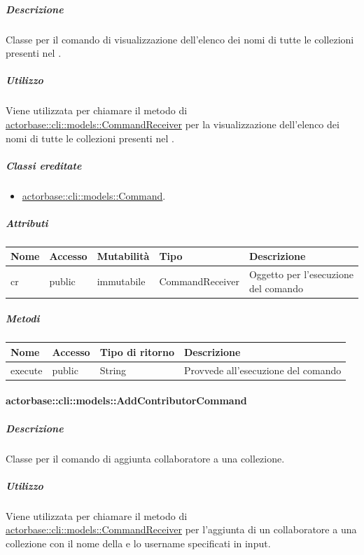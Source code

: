 \documentclass{scalatekids-article}
\begin{document}
\subparagraph{Descrizione}

Classe per il comando di visualizzazione dell'elenco dei nomi di tutte le
collezioni presenti nel .

\subparagraph{Utilizzo}

Viene utilizzata per chiamare il metodo di
\hyperref[sec:actorbase::cli::models::CommandReceiver]{actorbase::cli::models::CommandReceiver} per la visualizzazione dell'elenco dei
nomi di tutte le collezioni presenti nel .

\subparagraph{Classi ereditate}

\begin{itemize}
\item \hyperref[sec:actorbase::cli::models::Command]{actorbase::cli::models::Command}.
\end{itemize}

\subparagraph{Attributi}

\begin{tabular}{| p{1cm} | p{1.5cm} | p{2cm} | p{4cm} | p{8.5cm} |}
  \hline
  Nome & Accesso & Mutabilità & Tipo & Descrizione\\
  \hline
  cr & public & immutabile & CommandReceiver & Oggetto per l'esecuzione del comando\\
  \hline
\end{tabular}

\subparagraph{Metodi}

\begin{tabular}{| l | l | l | l |}
  \hline
  Nome & Accesso & Tipo di ritorno & Descrizione\\
  \hline
  execute & public & String & Provvede all'esecuzione del comando\\
  \hline
\end{tabular}

\paragraph{actorbase::cli::models::AddContributorCommand}
\label{sec:actorbase::cli::models::AddContributorCommand}

\subparagraph{Descrizione}

Classe per il comando di aggiunta collaboratore a una collezione.

\subparagraph{Utilizzo}

Viene utilizzata per chiamare il metodo di
\hyperref[sec:actorbase::cli::models::CommandReceiver]{actorbase::cli::models::CommandReceiver} per l'aggiunta di un collaboratore a
una collezione con il nome della  e lo username specificati
in input.
\end{document}
